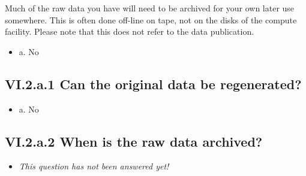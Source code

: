 \documentclass[a4paper,12pt]{report}
\begin{document}
\noindent
\begin{markdown}
Much of the raw data you have will need to be archived for your own later use somewhere. This is often done off-line on tape, not on the disks of the compute facility. Please note that this does not refer to the data publication.
\end{markdown}



\begin{itemize}
  \item[\CheckmarkBold] a. No
\end{itemize}




\subsection*{\protect\textcolor{colorSecId}{VI.2.a.1} Can the original data be regenerated?}

\label{d5b27482-b598-4b8c-b534-417d4ad27394.d5784d24-0e66-4821-bd62-a711fb6d7a40.a547dc69-a3e8-46e4-bb4b-21fd104231f9.b16e76a9-34a8-4ba5-9420-b58bebaeac8d}






\begin{itemize}
  \item[\CheckmarkBold] a. No
\end{itemize}




\subsection*{\protect\textcolor{colorSecId}{VI.2.a.2} When is the raw data archived?}

\label{d5b27482-b598-4b8c-b534-417d4ad27394.d5784d24-0e66-4821-bd62-a711fb6d7a40.a547dc69-a3e8-46e4-bb4b-21fd104231f9.7f8ff791-8593-4e00-93f9-e31c5dff5ffb}






\begin{itemize}
  \item[\XSolidBrush] \textit{This question has not been answered yet!}
\end{itemize}
  
\end{document}
